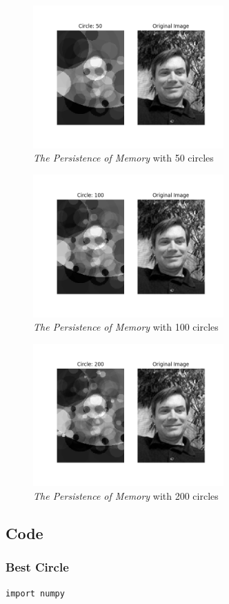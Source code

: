 \documentclass[12pt]{article}
\begin{document}
\begin{figure}[H]
\centering
\noindent\includegraphics[width=0.65\textwidth]{../results/jmcgough/jmcgough_0050.png}
\caption{\textit{The Persistence of Memory} with 50 circles}
\label{fig:jmcgough_0050}
\end{figure}

\begin{figure}[H]
\centering
\noindent\includegraphics[width=0.65\textwidth]{../results/jmcgough/jmcgough_0100.png}
\caption{\textit{The Persistence of Memory} with 100 circles}
\label{fig:jmcgough_0100}
\end{figure}

\begin{figure}[H]
\centering
\noindent\includegraphics[width=0.65\textwidth]{../results/jmcgough/jmcgough_0200.png}
\caption{\textit{The Persistence of Memory} with 200 circles}
\label{fig:jmcgough_0200}
\end{figure}



\newpage
\subsection*{Code}
\subsubsection*{Best Circle}
\begin{lstlisting}
import numpy
\end{lstlisting}
\end{document}
